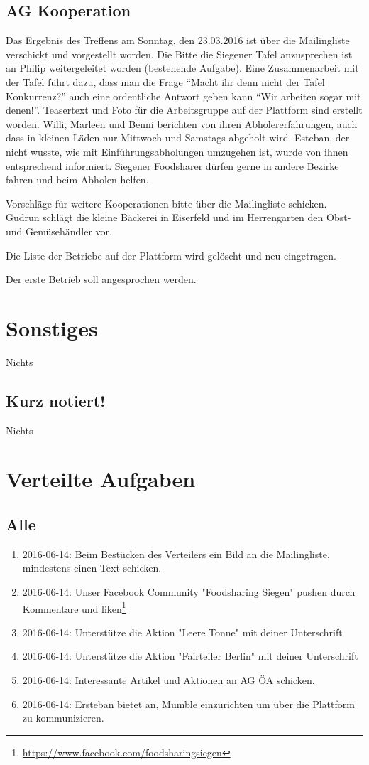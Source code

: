 \documentclass{scrreprt}
\begin{document}
\section{AG Kooperation}
Das Ergebnis des Treffens am Sonntag, den 23.03.2016 ist über die Mailingliste verschickt und vorgestellt worden. Die Bitte die Siegener Tafel anzusprechen ist an Philip weitergeleitet worden (bestehende Aufgabe). Eine Zusammenarbeit mit der Tafel führt dazu, dass man die Frage \enquote{Macht ihr denn nicht der Tafel Konkurrenz?} auch eine ordentliche Antwort geben kann \enquote{Wir arbeiten sogar mit denen!}. Teasertext und Foto für die Arbeitsgruppe auf der Plattform sind erstellt worden. Willi, Marleen und Benni berichten von ihren Abholererfahrungen, auch dass in kleinen Läden nur Mittwoch und Samstags abgeholt wird. Esteban, der nicht wusste, wie mit Einführungsabholungen umzugehen ist, wurde von ihnen entsprechend informiert. Siegener Foodsharer dürfen gerne in andere Bezirke fahren und beim Abholen helfen.\par
Vorschläge für weitere Kooperationen bitte über die Mailingliste schicken. Gudrun schlägt die kleine Bäckerei in Eiserfeld und im Herrengarten den Obst- und Gemüsehändler vor.\par 
Die Liste der Betriebe auf der Plattform wird gelöscht und neu eingetragen.\par
Der erste Betrieb soll angesprochen werden.
\chapter{Sonstiges}
Nichts

\section{Kurz notiert!}
Nichts
 
\chapter{Verteilte Aufgaben}
    \section{Alle}
    \begin{enumerate}
    	\item 2016-06-14: Beim Bestücken des Verteilers ein Bild an die Mailingliste, mindestens einen Text schicken.
		\item 2016-06-14:  Unser Facebook Community "Foodsharing Siegen" pushen durch Kommentare und liken\footnote{\url{https://www.facebook.com/foodsharingsiegen}}
		\item 2016-06-14: Unterstütze die Aktion "Leere Tonne" mit deiner Unterschrift
		\item 2016-06-14: Unterstütze die Aktion "Fairteiler Berlin" mit deiner Unterschrift
		\item 2016-06-14: Interessante Artikel und Aktionen an AG ÖA schicken.
    	\item 2016-06-14: Ersteban bietet an, Mumble einzurichten um über die Plattform zu kommunizieren.
    \end{enumerate}
    
\end{document}
